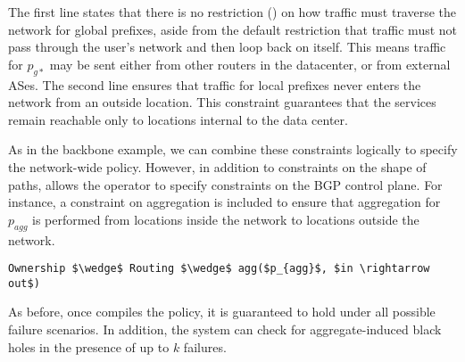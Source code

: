 The first line states that there is no restriction ()
on how traffic must
traverse the network for global prefixes, aside from the default restriction
that traffic must not pass through the user's network and then loop
back on itself. This means traffic for
$p_{g*}$ may be sent either from other routers in the datacenter, or
from external ASes. The second line ensures that traffic for local
prefixes never enters the network from an outside location. This constraint
guarantees that the services remain reachable only to locations
internal to the data center.

As in the backbone example, we can combine these constraints
logically to specify the network-wide policy.
However, in addition to constraints on the shape of paths,
\sysname allows the operator to specify constraints on the BGP control plane.
For instance, a constraint on aggregation is included to ensure that
aggregation for $p_{agg}$ is performed from locations inside the network
to locations outside the network. 

\begin{lstlisting}[mathescape=true]
Ownership $\wedge$ Routing $\wedge$ agg($p_{agg}$, $in \rightarrow out$)
\end{lstlisting}

As before, once \sysname compiles the policy, it is guaranteed to hold under
all possible failure scenarios. In addition, the system can check for
aggregate-induced black holes in the presence of up to $k$ failures.










